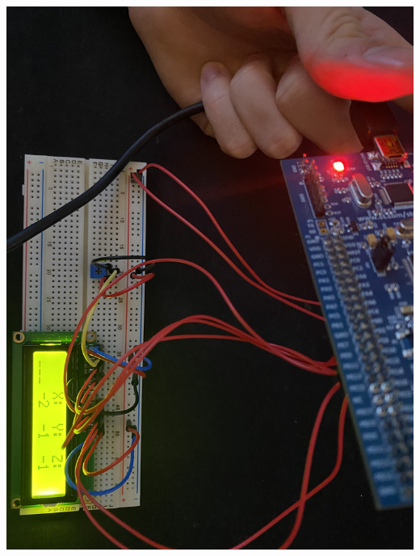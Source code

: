 \documentclass[12pt]{article}
\let\origfigure\figure
\let\endorigfigure\endfigure
\renewenvironment{figure}[1][2] {
    \expandafter\origfigure\expandafter[H]
} {
    \endorigfigure
}
\begin{document}
\begin{figure}[H]
\begin{floatrow}
{  \includegraphics[angle=90,origin=c, width=\linewidth]{images/przechyl_w_tyl.jpg}
}{%
  \caption{Wynik działania w przechyleniu w tył}%
}
\end{floatrow}
\end{figure}
\end{document}
